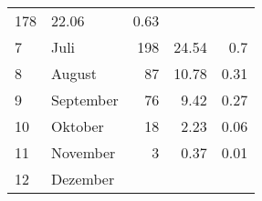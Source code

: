 \begin{longtable}{lXrrr}
       \num{178} &
       \num[round-mode=places,round-precision=2]{22.06} &
         \num[round-mode=places,round-precision=2]{0.63} \\

     7 &
     \multicolumn{1}{X}{ Juli   } &


       \num{198} &
       \num[round-mode=places,round-precision=2]{24.54} &
         \num[round-mode=places,round-precision=2]{0.7} \\

     8 &
     \multicolumn{1}{X}{ August   } &


       \num{87} &
       \num[round-mode=places,round-precision=2]{10.78} &
         \num[round-mode=places,round-precision=2]{0.31} \\

     9 &
     \multicolumn{1}{X}{ September   } &


       \num{76} &
       \num[round-mode=places,round-precision=2]{9.42} &
         \num[round-mode=places,round-precision=2]{0.27} \\

     10 &
     \multicolumn{1}{X}{ Oktober   } &


       \num{18} &
       \num[round-mode=places,round-precision=2]{2.23} &
         \num[round-mode=places,round-precision=2]{0.06} \\

     11 &
     \multicolumn{1}{X}{ November   } &


       \num{3} &
       \num[round-mode=places,round-precision=2]{0.37} &
         \num[round-mode=places,round-precision=2]{0.01} \\

     12 &
     \multicolumn{1}{X}{ Dezember   } &



\end{longtable}
